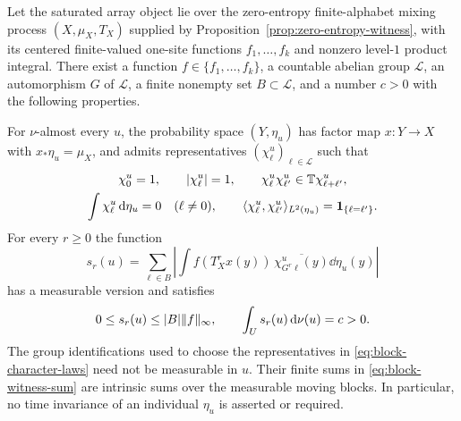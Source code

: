 \begin{proposition}\label{prop:block-witness}
Let the saturated array object lie over the zero-entropy finite-alphabet
mixing process $(X,\mu_X,T_X)$ supplied by
Proposition~\ref{prop:zero-entropy-witness}, with its centered
finite-valued one-site functions $f_1,\ldots,f_k$ and nonzero
level-$1$ product integral. There exist a function
$f\in\{f_1,\ldots,f_k\}$, a countable abelian group $\mathcal L$,
an automorphism $G$ of $\mathcal L$, a finite nonempty set
$B\subset\mathcal L$, and a number $c>0$ with the following properties.

For $\nu$-almost every $u$, the probability space $(Y,\eta_u)$
has factor map $x:Y\to X$ with $x_*\eta_u=\mu_X$, and admits
representatives $(\chi_\ell^u)_{\ell\in\mathcal L}$ such that
\begin{gather}
 \chi_0^u=1,\qquad |\chi_\ell^u|=1,\qquad
 \chi_\ell^u\chi_{\ell'}^u\in\mathbb T\chi_{\ell+\ell'}^u,
 \label{eq:block-character-laws}\\
 \int\chi_\ell^u\,\mathrm d\eta_u=0\quad(\ell\ne0),\qquad
 \langle \chi_\ell^u,\chi_{\ell'}^u\rangle_{L^2(\eta_u)}
       =\mathbf1_{\{\ell=\ell'\}}.
 \nonumber
\end{gather}
For every $r\ge0$ the function
\begin{equation}\label{eq:block-witness-sum}
 s_r(u)=\sum_{\ell\in B}
 \left|\int f(T_X^r x(y))\,
               \overline{\chi_{G^r\ell}^u(y)}\dd\eta_u(y)\right|
\end{equation}
has a measurable version and satisfies
\begin{equation}\label{eq:block-witness-integral}
 0\le s_r(u)\le |B|\lVert f\rVert_\infty,
 \qquad \int_U s_r(u)\,\mathrm d\nu(u)=c>0.
\end{equation}
The group identifications used to choose the representatives in
\eqref{eq:block-character-laws} need not be measurable in $u$.
Their finite sums in \eqref{eq:block-witness-sum} are intrinsic sums
over the measurable moving blocks. In particular, no time invariance
of an individual $\eta_u$ is asserted or required.
\end{proposition}

